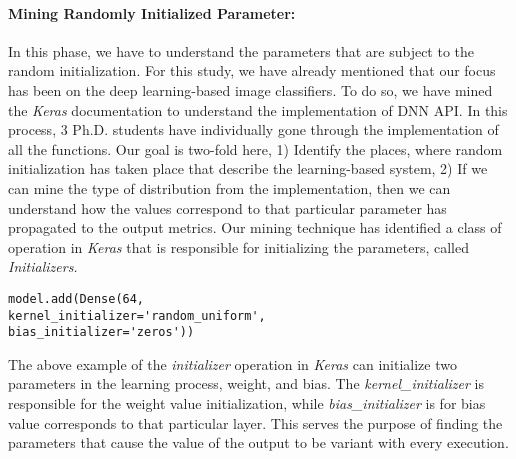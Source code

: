 \paragraph{\textbf{Mining Randomly Initialized Parameter:}}
In this phase, we have to understand the parameters that are subject to the random initialization. For this study, we have already mentioned that our focus has been on the deep learning-based image classifiers. To do so, we have mined the \emph{Keras} documentation to understand the implementation of DNN API. In this process, 3 Ph.D. students have individually gone through the implementation of all the functions. Our goal is two-fold here, 1) Identify the places, where random initialization has taken place that describe the learning-based system, 2) If we can mine the type of distribution from the implementation, then we can understand how the values correspond to that particular parameter has propagated to the output metrics. Our mining technique has identified a class of operation in \emph{Keras} that is responsible for initializing the parameters, called \emph{Initializers.} 
\begin{lstlisting}
model.add(Dense(64,
kernel_initializer='random_uniform',
bias_initializer='zeros'))
\end{lstlisting}
The above example of the \emph{initializer} operation in \emph{Keras} can initialize two parameters in the learning process, weight, and bias. The \emph{kernel\_initializer} is responsible for the weight value initialization, while \emph{bias\_initializer} is for bias value corresponds to that particular layer. This serves the purpose of finding the parameters that cause the value of the output to be variant with every execution. 

